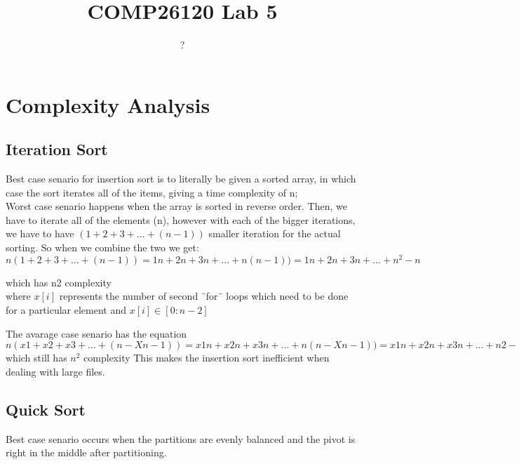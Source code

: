 \documentclass{article}
\title{COMP26120 Lab 5}
\author{?}
\begin{document}
\maketitle


\section{Complexity Analysis}
\label{sec:complexity}

\subsection{Iteration Sort}
Best case senario for insertion sort is to literally be given a sorted array, in which case
the sort iterates all of the items, giving a time complexity of n; \\

  Worst case senario happens when the array is sorted in reverse order.
Then, we have to iterate all of the elements (n), however with each of the bigger iterations, we have to have $(1 + 2 + 3 + ... + (n - 1))$ smaller iteration for the actual sorting. So when we combine the two we get: \\

   $n(1 + 2 + 3 + ... + (n-1)) 
=  1n + 2n + 3n + ... + n(n-1))
=  1n + 2n + 3n + ... + n^2 - n$

 which has n2 complexity \\

where $x[i]$ represents the number of second ¨for¨ loops which need to be done for a particular
element and $x[i] \in [0:n-2] $


 The avarage case senario has the equation \\

$   n(x1 + x2 + x3 + ... + (n-Xn-1))
=  x1n + x2n + x3n + ... + n(n-Xn-1))
=  x1n + x2n + x3n + ... + n2 - (Xn-1)n $ \\

 which still has $n^2$ complexity 
This makes the insertion sort inefficient when dealing with large files. \\



\subsection{Quick Sort}

  Best case senario occurs when the partitions are evenly balanced and the pivot is right in the middle
after partitioning. \\
\end{document}
